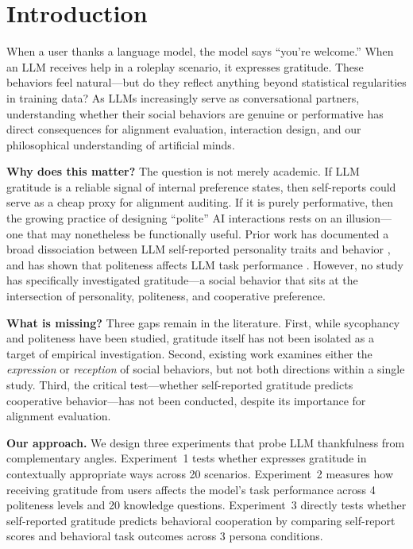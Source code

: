 \section{Introduction}
\label{sec:intro}

When a user thanks a language model, the model says ``you're welcome.'' When an LLM receives help in a roleplay scenario, it expresses gratitude. These behaviors feel natural---but do they reflect anything beyond statistical regularities in training data? As LLMs increasingly serve as conversational partners, understanding whether their social behaviors are genuine or performative has direct consequences for alignment evaluation, interaction design, and our philosophical understanding of artificial minds.

{\bf Why does this matter?} The question is not merely academic. If LLM gratitude is a reliable signal of internal preference states, then self-reports could serve as a cheap proxy for alignment auditing. If it is purely performative, then the growing practice of designing ``polite'' AI interactions rests on an illusion---one that may nonetheless be functionally useful. Prior work has documented a broad dissociation between LLM self-reported personality traits and behavior \citep{han2025personality}, and has shown that politeness affects LLM task performance \citep{yin2024politeness}. However, no study has specifically investigated gratitude---a social behavior that sits at the intersection of personality, politeness, and cooperative preference.

{\bf What is missing?} Three gaps remain in the literature. First, while sycophancy \citep{denison2024sycophancy, cheng2025elephant} and politeness \citep{zhao2025politeness} have been studied, gratitude itself has not been isolated as a target of empirical investigation. Second, existing work examines either the \emph{expression} or \emph{reception} of social behaviors, but not both directions within a single study. Third, the critical test---whether self-reported gratitude predicts cooperative behavior---has not been conducted, despite its importance for alignment evaluation.

{\bf Our approach.} We design three experiments that probe LLM thankfulness from complementary angles. Experiment~1 tests whether \gptfour expresses gratitude in contextually appropriate ways across 20 scenarios. Experiment~2 measures how receiving gratitude from users affects the model's task performance across 4 politeness levels and 20 knowledge questions. Experiment~3 directly tests whether self-reported gratitude predicts behavioral cooperation by comparing self-report scores and behavioral task outcomes across 3 persona conditions.

